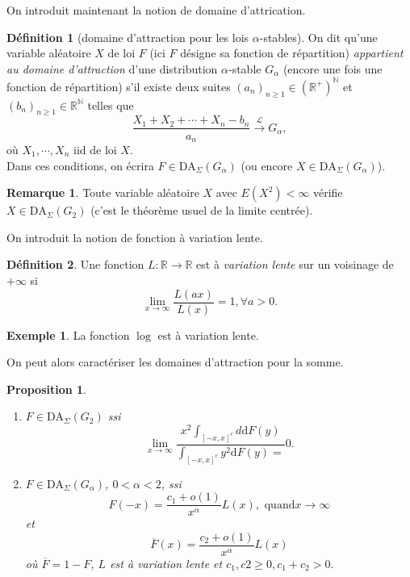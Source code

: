 \documentclass[10p,a4paper,reqno,titlepage]{report}
\newcommand{\R}{\mathbb{R}}
\newcommand{\N}{\mathbb{N}}
\newcounter{dader}[chapter]
\theoremstyle{plain}
\newtheorem{prop}[prop]{Proposition}
\theoremstyle{definition}
\newtheorem{de}[de]{Définition}
\newtheorem{rem}[dader]{Remarque}
\newtheorem{ex}[ex]{Exemple}
\newcommand{\cvloi}{\stackrel{\mathcal{L}}{\longrightarrow}}
\begin{document}
On introduit maintenant la notion de domaine d'attrication.
\begin{de}[domaine d'attraction pour les lois $\alpha$-stables]
	On dit qu'une variable aléatoire $X$ de loi $F$ (ici $F$ désigne sa fonction de répartition) \textit{appartient au domaine d'attraction} d'une distribution $\alpha$-stable $G_\alpha$ (encore une fois une fonction de répartition) s'il existe deux suites $(a_n)_{n\geq 1} \in (\R^+)^\N$ et $(b_n)_{n\geq 1}\in\R^\N$ telles que 
	$$ \frac{X_1+X_2 +\cdots + X_n -b_n}{a_n} \cvloi G_\alpha,$$
	 où $X_1,\cdots,X_n$ iid de loi $X$. \\
	 Dans ces conditions, on écrira $F \in \mathrm{DA}_{\Sigma} (G_\alpha)$ (ou encore $X\in\mathrm{DA}_{\Sigma}(G_\alpha)$).
 \end{de}
\begin{rem}
	Toute variable aléatoire $X$ avec $E(X^2)<\infty$ vérifie $X\in\mathrm{DA}_{\Sigma}(G_2)$ (c'est le théorème usuel de la limite centrée).
\end{rem}
On introduit la notion de fonction à variation lente.
\begin{de}
	Une fonction $L : \R \to \R$ est à \textit{variation lente} sur un voisinage de $+\infty$ si
	$$ \lim_{x\to\infty} \frac{L(ax)}{L(x)}=1 , \forall a >0.$$
	
\end{de}
\begin{ex}
	La fonction $\log$ est à variation lente.
\end{ex}
On peut alors caractériser les domaines d'attraction pour la somme.
\begin{prop}\
	\begin{enumerate}
		\item $F \in \mathrm{DA}_{\Sigma} (G_2)$ ssi 
		$$ \lim_{x \to \infty} \frac{x^2 \int_{[-x,x]^c} d\mathrm d F(y)}{\int_{[-x,x]^c} y^2\mathrm d F(y)=}0.$$
		\item $F \in \mathrm{DA}_{\Sigma}(G_\alpha)$, $0 < \alpha <2$, ssi 
		$$ F(-x) =\frac{c_1+o(1)}{x^\alpha} L(x),\text{ quand} x\to \infty$$
		et 
		$$ \overline{F}(x)= \frac{c_2+o(1)}{x^\alpha} L(x)$$
		où $\overline{F}=1-F$, $L$ est à variation lente et $c_1,c2\geq 0, c_1+ c_2 >0.$
	\end{enumerate}
\end{prop}
\end{document}
